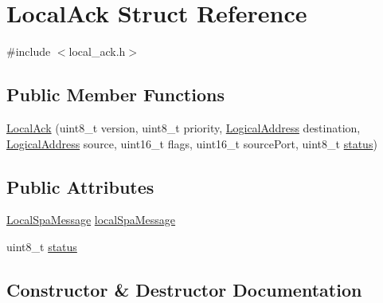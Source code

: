 \hypertarget{structLocalAck}{}\section{Local\+Ack Struct Reference}
\label{structLocalAck}


{\ttfamily \#include $<$local\+\_\+ack.\+h$>$}

\subsection*{Public Member Functions}
\begin{DoxyCompactItemize}
\item 
\hyperlink{structLocalAck_a5f39e6414e3fcf30259766ae0b93b108}{Local\+Ack} (uint8\+\_\+t version, uint8\+\_\+t priority, \hyperlink{structLogicalAddress}{Logical\+Address} destination, \hyperlink{structLogicalAddress}{Logical\+Address} source, uint16\+\_\+t flags, uint16\+\_\+t source\+Port, uint8\+\_\+t \hyperlink{structLocalAck_afab082585d3d05a6abd22f4498a8edca}{status})
\end{DoxyCompactItemize}
\subsection*{Public Attributes}
\begin{DoxyCompactItemize}
\item 
\hyperlink{structLocalSpaMessage}{Local\+Spa\+Message} \hyperlink{structLocalAck_aec0984fd1a1277eb62f8cb843993afb0}{local\+Spa\+Message}
\item 
uint8\+\_\+t \hyperlink{structLocalAck_afab082585d3d05a6abd22f4498a8edca}{status}
\end{DoxyCompactItemize}


\subsection{Constructor \& Destructor Documentation}
\mbox{\label{structLocalAck_a5f39e6414e3fcf30259766ae0b93b108}} 
